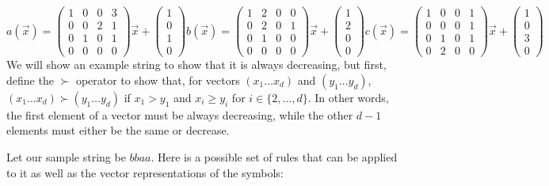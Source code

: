 \[
a(\Vec{x}) = \begin{pmatrix}
1&0&0&3\\
0&0&2&1\\
0&1&0&1\\
0&0&0&0
\end{pmatrix} \Vec{x} + \begin{pmatrix}
1\\
0\\
1\\
0
\end{pmatrix}
b(\Vec{x}) = \begin{pmatrix}
1&2&0&0\\
0&2&0&1\\
0&1&0&0\\
0&0&0&0
\end{pmatrix} \Vec{x} + \begin{pmatrix}
1\\
2\\
0\\
0
\end{pmatrix}
c(\Vec{x}) = \begin{pmatrix}
1&0&0&1\\
0&0&0&1\\
0&1&0&1\\
0&2&0&0
\end{pmatrix} \Vec{x} + \begin{pmatrix}
1\\
0\\
3\\
0
\end{pmatrix}
\]
We will show an example string to show that it is always decreasing, but first, define the $\succ$ operator to show that, for vectors $(x_1 \ldots x_d)$ and $(y_1 \ldots y_d)$, $(x_1 \ldots x_d) \succ (y_1 \ldots y_d)$ if $x_1 > y_1$ and $x_i \geq y_i$ for $i \in \{2, \ldots, d\}$. In other words, the first element of a vector must be always decreasing, while the other $d-1$ elements must either be the same or decrease. \par
Let our sample string be $bbaa$. Here is a possible set of rules that can be applied to it as well as the vector representations of the symbols:
